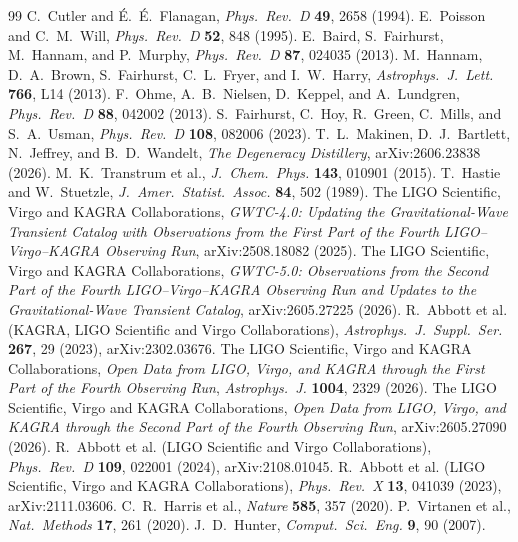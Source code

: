 \documentclass[aps,prd,twocolumn,amsmath,amssymb,nofootinbib,superscriptaddress]{revtex4-2}
\begin{document}
\begin{thebibliography}{99}
 C.~Cutler and {\'E}.~{\'E}.~Flanagan,
\emph{Phys.\ Rev.\ D} \textbf{49}, 2658 (1994).
 E.~Poisson and C.~M.~Will,
\emph{Phys.\ Rev.\ D} \textbf{52}, 848 (1995).
 E.~Baird, S.~Fairhurst, M.~Hannam, and P.~Murphy,
\emph{Phys.\ Rev.\ D} \textbf{87}, 024035 (2013).
 M.~Hannam, D.~A.~Brown, S.~Fairhurst, C.~L.~Fryer, and
I.~W.~Harry, \emph{Astrophys.\ J.\ Lett.} \textbf{766}, L14 (2013).
 F.~Ohme, A.~B.~Nielsen, D.~Keppel, and A.~Lundgren,
\emph{Phys.\ Rev.\ D} \textbf{88}, 042002 (2013).
 S.~Fairhurst, C.~Hoy, R.~Green, C.~Mills, and
S.~A.~Usman, \emph{Phys.\ Rev.\ D} \textbf{108}, 082006 (2023).
 T.~L.~Makinen, D.~J.~Bartlett, N.~Jeffrey, and
B.~D.~Wandelt, \emph{The Degeneracy Distillery}, arXiv:2606.23838 (2026).
 M.~K.~Transtrum et al.,
\emph{J.\ Chem.\ Phys.} \textbf{143}, 010901 (2015).
 T.~Hastie and W.~Stuetzle,
\emph{J.\ Amer.\ Statist.\ Assoc.} \textbf{84}, 502 (1989).
 The LIGO Scientific, Virgo and KAGRA Collaborations,
\emph{GWTC-4.0: Updating the Gravitational-Wave Transient Catalog with Observations from the First Part
of the Fourth LIGO--Virgo--KAGRA Observing Run}, arXiv:2508.18082 (2025).
 The LIGO Scientific, Virgo and KAGRA Collaborations,
\emph{GWTC-5.0: Observations from the Second Part of the Fourth LIGO--Virgo--KAGRA Observing Run and
Updates to the Gravitational-Wave Transient Catalog}, arXiv:2605.27225 (2026).
 R.~Abbott et al. (KAGRA, LIGO Scientific and Virgo Collaborations),
\emph{Astrophys.\ J.\ Suppl.\ Ser.} \textbf{267}, 29 (2023), arXiv:2302.03676.
 The LIGO Scientific, Virgo and KAGRA Collaborations,
\emph{Open Data from LIGO, Virgo, and KAGRA through the First Part of the Fourth Observing Run},
\emph{Astrophys.\ J.} \textbf{1004}, 2329 (2026).
 The LIGO Scientific, Virgo and KAGRA Collaborations,
\emph{Open Data from LIGO, Virgo, and KAGRA through the Second Part of the Fourth Observing Run},
arXiv:2605.27090 (2026).
 R.~Abbott et al. (LIGO Scientific and Virgo Collaborations),
\emph{Phys.\ Rev.\ D} \textbf{109}, 022001 (2024), arXiv:2108.01045.
 R.~Abbott et al. (LIGO Scientific, Virgo and KAGRA Collaborations),
\emph{Phys.\ Rev.\ X} \textbf{13}, 041039 (2023), arXiv:2111.03606.
 C.~R.~Harris et al., \emph{Nature} \textbf{585}, 357 (2020).
 P.~Virtanen et al., \emph{Nat.\ Methods} \textbf{17}, 261 (2020).
 J.~D.~Hunter, \emph{Comput.\ Sci.\ Eng.} \textbf{9}, 90 (2007).
\end{thebibliography}
\end{document}
